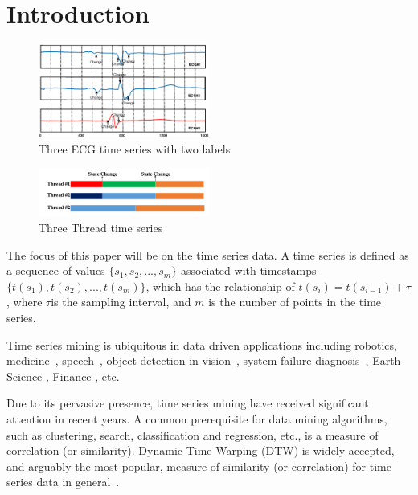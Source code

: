 \section{Introduction}
\label{sec:introduction}

\begin{figure}[t]
\centering
\includegraphics[width=0.5\textwidth]{ECGExp.eps}
\caption{ Three ECG time series with two labels }
\label{fig:ecgexample}
\end{figure}

\begin{figure}[t]
\centering
\includegraphics[width=0.50\textwidth]{HPCExample.pdf}
\caption{Three Thread time series}
\label{fig:hpcexample}
\end{figure}

The focus of this paper will be on the time series data. A time series is defined as a sequence of values $\{s_1,s_2,...,s_m\}$
associated with timestamps $\{t(s_1), t(s_2),..., t(s_m)\}$, which has the relationship of $t(s_i) = t(s_{i-1})+\tau$, where $\tau$is the sampling interval, and $m$ is the number of points in the time series.

Time series mining is ubiquitous in data driven applications including robotics, medicine~\cite{oates2000method,caracca2000discovering}, speech~\cite{rabiner1993fundamentals}, object detection in vision~\cite{yang2002detecting, sonka2014image}, system failure diagnosis~\cite{luo2014correlating,sun2014querying}, Earth Science \cite{mudelsee2013climate}, Finance \cite{granger2014forecasting}, etc.

Due to its pervasive presence, time series mining have received significant attention in recent years. A common prerequisite for data mining algorithms, such as clustering, search, classification and regression, etc., is a measure of correlation (or similarity). Dynamic Time Warping (DTW) is widely accepted, and arguably the most popular, measure of similarity (or correlation) for time series data in general~\cite{rakthanmanon2012searching, muller2007dynamic, chen2013dtw}.

